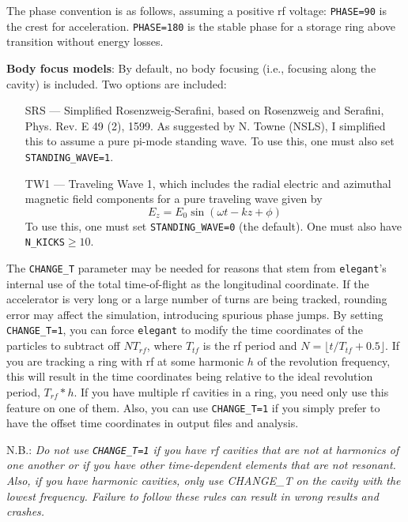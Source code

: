 The phase convention is as follows, assuming a positive rf voltage:
\verb|PHASE=90| is the crest for acceleration.  \verb|PHASE=180| is the stable
phase for a storage ring above transition without energy losses.

{\bf Body focus models}: By default, no body focusing (i.e., focusing along the
cavity) is included. Two options are included:
\begin{itemize}
\item[SRS] --- Simplified Rosenzweig-Serafini, based on Rosenzweig and Serafini, Phys. Rev. E 49 (2),
1599.  As suggested by N. Towne (NSLS), I simplified this to assume a pure pi-mode
standing wave. To use this, one must also set \verb|STANDING_WAVE=1|.
\item[TW1] --- Traveling Wave 1, which includes the radial electric and azimuthal
magnetic field components for a pure traveling wave given by 
\begin{equation}
        E_z = E_0 \sin \left(\omega t - k z + \phi\right)
\end{equation}
To use this, one must set \verb|STANDING_WAVE=0| (the default). One must also have \verb|N_KICKS|$\geq 10$.
\end{itemize}

The \verb|CHANGE_T| parameter may be needed for reasons that stem from
{\tt elegant}'s internal use of the total time-of-flight as the
longitudinal coordinate.  If the accelerator is very long or a large
number of turns are being tracked, rounding error may affect the
simulation, introducing spurious phase jumps.  By setting
\verb|CHANGE_T=1|, you can force {\tt elegant} to modify the time
coordinates of the particles to subtract off $N T_{rf}$, where
$T_{tf}$ is the rf period and $N = \lfloor t/T_{tf}+0.5\rfloor$.  If
you are tracking a ring with rf at some harmonic $h$ of the revolution
frequency, this will result in the time coordinates being relative to
the ideal revolution period, $T_{rf}*h$.  If you have multiple rf
cavities in a ring, you need only use this feature on one of them.
Also, you can use \verb|CHANGE_T=1| if you simply prefer to have the
offset time coordinates in output files and analysis. 

N.B.: {\em Do not use \verb|CHANGE_T=1| if you have rf cavities that
are not at harmonics of one another or if you have other
time-dependent elements that are not resonant. Also, if you have harmonic
cavities, only use CHANGE_T on the cavity with the lowest frequency.
Failure to follow these rules can result in wrong results and crashes.}
